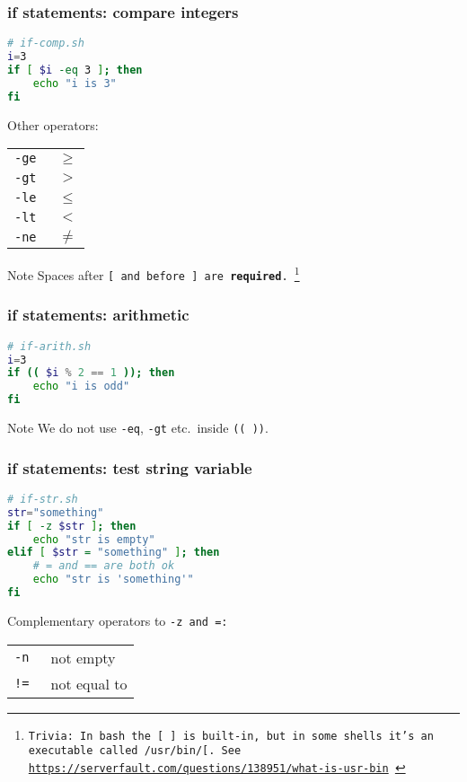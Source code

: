 \begin{frame}[fragile]
\frametitle{\textbf{if} statements: compare integers}
\begin{lstlisting}[language=bash]
# if-comp.sh
i=3
if [ $i -eq 3 ]; then
    echo "i is 3"
fi
\end{lstlisting}
Other operators:
\begin{table}
    \centering
    \begin{tabular}{ll}
        \tt{-ge} & $\geq$ \\
        \tt{-gt} & $>$    \\
        \tt{-le} & $\leq$ \\
        \tt{-lt} & $<$    \\
        \tt{-ne} & $\neq$
    \end{tabular}
\end{table}
\begin{block}{Note}
    Spaces after \tt{[} and before \tt{]} are \textbf{required}.
    \footnote{
        Trivia: In bash the \tt{[ ]} is built-in, but in some shells
        it's an executable called \tt{/usr/bin/[}.
        See \url{https://serverfault.com/questions/138951/what-is-usr-bin}
    }
\end{block}
\end{frame}

\begin{frame}[fragile]
\frametitle{\textbf{if} statements: arithmetic}
\begin{lstlisting}[language=bash]
# if-arith.sh
i=3
if (( $i % 2 == 1 )); then
    echo "i is odd"
fi
\end{lstlisting}
\begin{block}{Note}
    We do not use \verb|-eq|, \verb|-gt| etc.~inside \verb|(( ))|.
\end{block}
\end{frame}

\begin{frame}[fragile]
\frametitle{\textbf{if} statements: test string variable}
\begin{lstlisting}[language=bash]
# if-str.sh
str="something"
if [ -z $str ]; then
    echo "str is empty"
elif [ $str = "something" ]; then
    # = and == are both ok
    echo "str is 'something'"
fi
\end{lstlisting}
Complementary operators to \tt{-z} and \tt{=}:
\begin{table}
    \centering
    \begin{tabular}{ll}
        \tt{-n} & not empty \\
        \tt{!=} & not equal to
    \end{tabular}
\end{table}
\end{frame}

